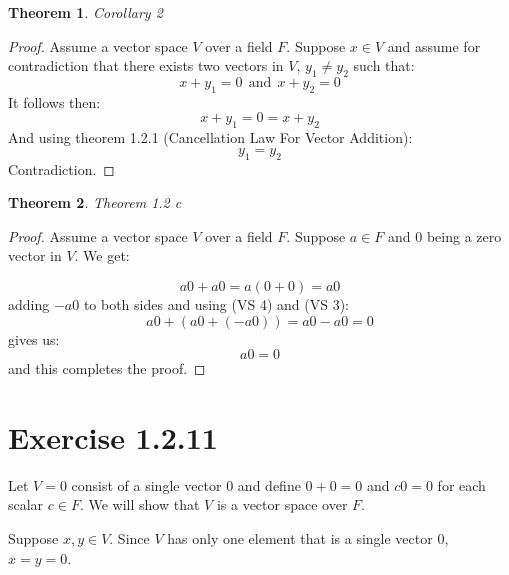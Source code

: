 \documentclass{article}
\newtheorem*{theorem}{Theorem}
\begin{document}
\begin{theorem}
    Corollary 2
\end{theorem}
\begin{proof}
    Assume a vector space \(V\) over a field \(F\). Suppose \(x \in V\) and assume for contradiction
    that there exists two vectors in \(V\), \(y_1 \neq y_2\) such that:
    \begin{equation*}
        x + y_1 = 0 \ \ \mbox{and} \ \ x + y_2 = 0
    \end{equation*}
    It follows then:
    \begin{equation*}
        x + y_1 = 0 = x + y_2
    \end{equation*}
    And using theorem 1.2.1 (Cancellation Law For Vector Addition):
    \begin{equation*}
        y_1 = y_2
    \end{equation*}
    Contradiction.
\end{proof}

\begin{theorem}
    Theorem 1.2 c
\end{theorem}
\begin{proof}
    Assume a vector space \(V\) over a field \(F\). Suppose \(a \in F\) and \(0\) being a zero vector in \(V\).
    We get:

    \begin{equation*}
        a0 + a0 = a(0 + 0) = a0
    \end{equation*}
    adding \(-a0\) to both sides and using (VS 4) and (VS 3):
    \begin{equation*}
        a0 + (a0 + (-a0)) = a0 - a0 = 0
    \end{equation*}
    gives us:
    \begin{equation*}
        a0 = 0
    \end{equation*}
    and this completes the proof.
\end{proof}

\section*{Exercise 1.2.11}

Let \(V = {0}\) consist of a single vector \(0\) and define \(0 + 0 = 0\) and
\(c0 = 0\) for each scalar \(c \in F\). We will show that \(V\) is a vector
space over \(F\).

Suppose \(x, y \in V\). Since \(V\) has only one element
that is a single vector \(0\), \(x = y = 0\).
\end{document}
